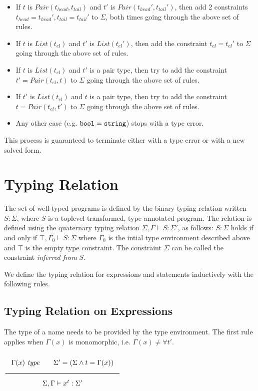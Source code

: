 \begin{itemize}
\item If $t$ is $Pair(t_{head},t_{tail})$ and
  $t'$ is $Pair(t_{head} ',t_{tail} ')$, then add 2 constraints
  $t_{head} = t_{head} ', t_{tail} = t_{tail} '$ to $\Sigma$, both times going through the above set of rules.
\item If $t$ is $List(t_{el})$ and
  $t'$ is $List(t_{el} ')$, then add the constraint
  $t_{el} = t_{el} '$ to $\Sigma$ going through the above set of rules.
\item If $t$ is $List(t_{el})$ and
$t'$ is a pair type, then try to add the constraint $t' = Pair(t_{el}, t)$ to $\Sigma$ going through the above set of rules.
\item If $t'$ is $List(t_{el})$ and
$t$ is a pair type, then try to add the constraint $t = Pair(t_{el}, t')$ to $\Sigma$ going through the above set of rules.
\item Any other case  (e.g. $\texttt{bool} = \texttt{string}$) stops with a type error.
\end{itemize}
This process is guaranteed to terminate either with a type error or with a new solved form.

\section{Typing Relation}

The set of well-typed programs is defined by the binary typing relation
written $S: \Sigma$, where $S$ is a toplevel-transformed, type-annotated program.
The relation is defined using the quaternary typing relation
$\Sigma, \Gamma \vdash S : \Sigma'$, as follows:
$S: \Sigma$ holds if and only if 
$\top, \Gamma_0 \vdash S : \Sigma$
where $\Gamma_0$ is the intial type environment described above and $\top$ is the empty
type constraint. The constraint $\Sigma$ can be called the constraint \emph{inferred from}
$S$. 

We define the typing relation for expressions and statements
inductively with the following rules.

\subsection{Typing Relation on Expressions}

The type of a name needs to be provided by the type environment. The first rule
applies when $\Gamma(x)$ is monomorphic, i.e. $\Gamma(x) \neq \forall t'$.

\noindent
$\Rule{\Gamma(x)\ \type \qquad
  \Sigma' = (\Sigma \wedge t = \Gamma(x))}{\Sigma, \Gamma \vdash x^t : \Sigma'}$


